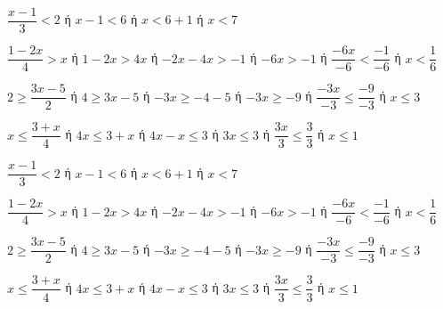 \begin{alist}
\item $ \dfrac{x-1}{3}<2 $ ή $ x-1<6 $ ή $ x<6+1 $ ή $ x<7 $
\item $ \dfrac{1-2x}{4}>x $ ή $ 1-2x>4x $ ή $ -2x-4x>-1 $ ή $ -6x>-1 $ ή $ \dfrac{-6x}{-6}<\dfrac{-1}{-6} $ ή $ x<\dfrac{1}{6} $
\item $ 2\geq\dfrac{3x-5}{2} $ ή $ 4\geq 3x-5 $ ή $ -3x\geq -4-5 $ ή $ -3x\geq -9 $ ή $ \dfrac{-3x}{-3}\leq\dfrac{-9}{-3} $ ή $ x\leq 3 $
\item $ x\leq\dfrac{3+x}{4} $ ή $ 4x\leq 3+x $ ή $ 4x-x\leq 3 $ ή $ 3x\leq 3 $ ή $ \dfrac{3x}{3}\leq\dfrac{3}{3} $ ή $ x\leq 1 $
\end{alist}
\begin{alist}
\item $ \dfrac{x-1}{3}<2 $ ή $ x-1<6 $ ή $ x<6+1 $ ή $ x<7 $
\item $ \dfrac{1-2x}{4}>x $ ή $ 1-2x>4x $ ή $ -2x-4x>-1 $ ή $ -6x>-1 $ ή $ \dfrac{-6x}{-6}<\dfrac{-1}{-6} $ ή $ x<\dfrac{1}{6} $
\item $ 2\geq\dfrac{3x-5}{2} $ ή $ 4\geq 3x-5 $ ή $ -3x\geq -4-5 $ ή $ -3x\geq -9 $ ή $ \dfrac{-3x}{-3}\leq\dfrac{-9}{-3} $ ή $ x\leq 3 $
\item $ x\leq\dfrac{3+x}{4} $ ή $ 4x\leq 3+x $ ή $ 4x-x\leq 3 $ ή $ 3x\leq 3 $ ή $ \dfrac{3x}{3}\leq\dfrac{3}{3} $ ή $ x\leq 1 $
\end{alist}
